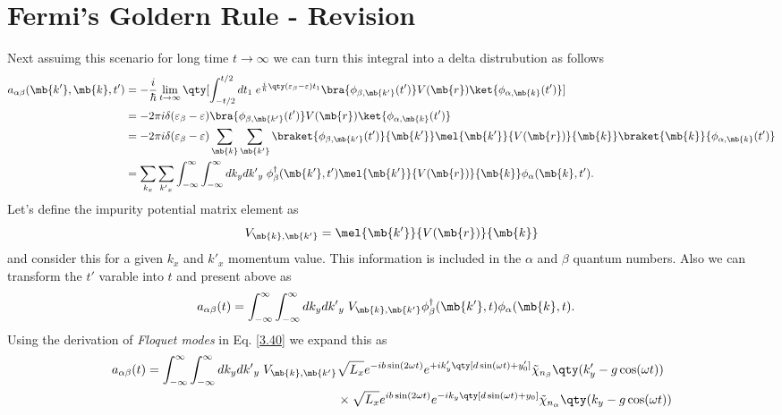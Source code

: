 \section{Fermi's Goldern Rule - Revision}

Next assuimg this scenario for long time $t \rightarrow \infty$ we can turn this integral into a delta distrubution as follows
\begin{equation} \label{0.1}
  \begin{aligned}
    a_{\alpha\beta}(\mb{k'},\mb{k},t') & =
    -
    \frac{i}{\hbar}
    \lim_{t \rightarrow \infty}\qty[
      \int_{-t/2}^{t/2} dt_1 \;
      e^{\frac{i}{\hbar}\qty(\varepsilon_{\beta} - \varepsilon)t_1}
      \bra{\phi_{\beta,\mb{k'}}(t')}
      V(\mb{r}) \ket{\phi_{\alpha,\mb{k}}(t')}
    ] \\
    & =
    -2\pi i \delta(\varepsilon_{\beta} - \varepsilon)
    \bra{\phi_{\beta,\mb{k'}}(t')}
    V(\mb{r}) \ket{\phi_{\alpha,\mb{k}}(t')}
    \\
    & =
    -2\pi i \delta(\varepsilon_{\beta} - \varepsilon)
    \sum_{\mb{k}}\sum_{\mb{k'}}
    \braket{\phi_{\beta,\mb{k'}}(t')}{\mb{k'}}
    \mel{\mb{k'}}{V(\mb{r})}{\mb{k}}
    \braket{\mb{k}}{\phi_{\alpha,\mb{k}}(t')}
    \\
    & =
    \sum_{k_x}\sum_{{k'}_x}
    \int_{-\infty}^{\infty} \int_{-\infty}^{\infty} dk_y d{k'}_y \;
    \phi_{\beta}^{\dagger}(\mb{k'},t')
    \mel{\mb{k'}}{V(\mb{r})}{\mb{k}}
    \phi_{\alpha}(\mb{k},t').
  \end{aligned}
\end{equation}
Let's define the impurity potential matrix element as
\begin{equation} \label{0.2}
  V_{\mb{k}, \mb{k'}} = \mel{\mb{k'}}{V(\mb{r})}{\mb{k}}
\end{equation}
and consider this for a given $k_x$ and $k'_x$ momentum value. This information is included in the $\alpha$ and $\beta$ quantum numbers. Also we can transform the $t'$ varable into $t$ and present above as
\begin{equation} \label{0.3}
  \begin{aligned}
    a_{\alpha\beta}(t) & =
    \int_{-\infty}^{\infty} \int_{-\infty}^{\infty} dk_y d{k'}_y \;
    V_{\mb{k}, \mb{k'}}
    \phi_{\beta}^{\dagger}(\mb{k'},t)
    \phi_{\alpha}(\mb{k},t).
  \end{aligned}
\end{equation}
Using the derivation of \textit{Floquet modes} in Eq. \eqref{3.40} we expand this as
\begin{equation} \label{0.4}
  \begin{aligned}
    a_{\alpha\beta}(t) =
    \int_{-\infty}^{\infty} \int_{-\infty}^{\infty} dk_y d{k'}_y \;
    V_{\mb{k}, \mb{k'}} &
    {\sqrt{L_x}}
    e^{
      -ib\sin(2\omega t)
    }
    e^{
      +ik'_y  \qty[d\sin(\omega t) + y'_0]
    }
    \tilde{\chi}_{n_{\beta}}\qty(k'_y -g\cos(\omega t)) \\
    & \times
    {\sqrt{L_x}}
    e^{
      ib\sin(2\omega t)
    }
    e^{
      -ik_y  \qty[d\sin(\omega t) + y_0]
    }
    \tilde{\chi}_{n_{\alpha}}\qty(k_y -g\cos(\omega t))
  \end{aligned}
\end{equation}
